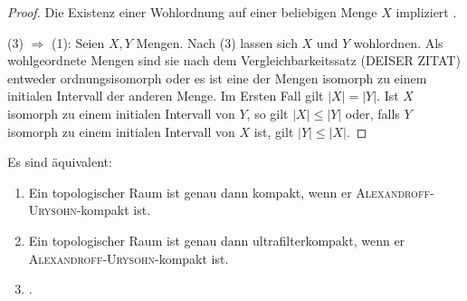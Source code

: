 \begin{proof}
  Die Existenz einer Wohlordnung auf einer beliebigen Menge $X$ impliziert \AC.

  (3) $\Rightarrow$ (1):
  Seien $X,Y$ Mengen. Nach (3) lassen sich $X$ und $Y$ wohlordnen.
  Als wohlgeordnete Mengen sind sie nach dem Vergleichbarkeitssatz (DEISER ZITAT) entweder ordnungsisomorph oder es ist eine der Mengen isomorph zu einem initialen Intervall der anderen Menge.
  Im Ersten Fall gilt $|X| = |Y|$.
  Ist $X$ isomorph zu einem initialen Intervall von $Y$, so gilt $|X| \leq |Y|$ oder, falls $Y$ isomorph zu einem initialen Intervall von $X$ ist, gilt $|Y| \leq |X|$.
\end{proof}

\begin{thm}
  \label{thm:alexandroffUrysohnCompactAC}
  Es sind äquivalent:
  \begin{enumerate}[(1)]
    \item Ein topologischer Raum ist genau dann kompakt, wenn er \textsc{Alexandroff}\hyp{}\textsc{Urysohn}\hyp{}kompakt ist.
    \item Ein topologischer Raum ist genau dann ultrafilterkompakt, wenn er \textsc{Alexandroff}\hyp{}\textsc{Urysohn}\hyp{}kompakt ist.
    \item \AC.
  \end{enumerate}
\end{thm}

